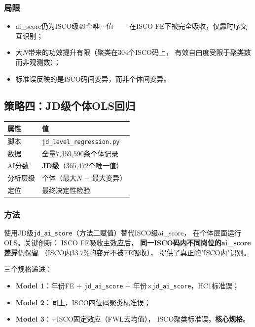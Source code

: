 \documentclass[12pt,a4paper]{ctexart}
\begin{document}
\subsubsection{局限}

\begin{itemize}
\item ai\_score仍为ISCO级49个唯一值——
      在ISCO FE下被完全吸收，仅靠时序交互识别；
\item 大$N$带来的功效提升有限（聚类在304个ISCO码上，
      有效自由度受限于聚类数而非观测数）；
\item 标准误反映的是ISCO码间变异，而非个体间变异。
\end{itemize}


\subsection{策略四：JD级个体OLS回归}
\label{subsec:jd_ols}

\begin{table}[h!]
\centering
\small
\begin{tabular}{ll}
\toprule
\textbf{属性} & \textbf{值} \\
\midrule
脚本 & \texttt{jd\_level\_regression.py} \\
数据 & 全量7,359,590条个体记录 \\
AI分数 & \textbf{JD级}（365,472个唯一值） \\
分析层级 & 个体（最大$N$ + 最大变异） \\
定位 & 最终决定性检验 \\
\bottomrule
\end{tabular}
\end{table}

\subsubsection{方法}

使用JD级\texttt{jd\_ai\_score}（方法二赋值）替代ISCO级ai\_score，
在个体层面运行OLS。关键创新：
ISCO FE吸收主效应后，
\textbf{同一ISCO码内不同岗位的ai\_score差异}仍保留
（ISCO内33.7\%的变异不被FE吸收），
提供了真正的"ISCO内"识别。

三个规格递进：

\begin{itemize}
\item \textbf{Model 1}：年份FE + \texttt{jd\_ai\_score}
      + 年份$\times$\texttt{jd\_ai\_score}，HC1标准误；
\item \textbf{Model 2}：同上，ISCO四位码聚类标准误；
\item \textbf{Model 3}：$+$ISCO固定效应（FWL去均值），
      ISCO聚类标准误。\textbf{核心规格}。
\end{itemize}
\end{document}

